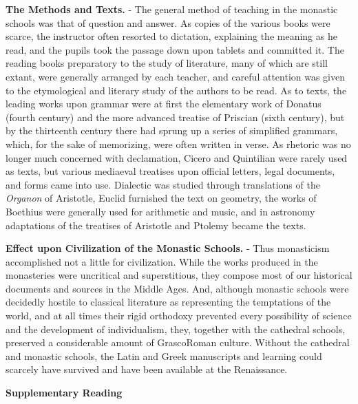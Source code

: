 \documentclass[
]{book}
\begin{document}
\textbf{The Methods and Texts.} - The general method of teaching in the monastic schools was that of question and answer. As copies of the various books were scarce, the instructor often resorted to dictation, explaining the meaning as he read, and the pupils took the passage down upon tablets and committed it. The reading books preparatory to the study of literature, many of which are still extant, were generally arranged by each teacher, and careful attention was given to the etymological and literary study of the authors to be read. As to texts, the leading works upon grammar were at first the elementary work of Donatus (fourth century) and the more advanced treatise of Priscian (sixth century), but by the thirteenth century there had sprung up a series of simplified grammars, which, for the sake of memorizing, were often written in verse. As rhetoric was no longer much concerned with declamation, Cicero and Quintilian were rarely used as texts, but various mediaeval treatises upon official letters, legal documents, and forms came into use. Dialectic was studied through translations of the \emph{Organon} of Aristotle, Euclid furnished the text on geometry, the works of Boethius were generally used for arithmetic and music, and in astronomy adaptations of the treatises of Aristotle and Ptolemy became the texts.

\textbf{Effect upon Civilization of the Monastic Schools.} - Thus monasticism accomplished not a little for civilization. While the works produced in the monasteries were uncritical and superstitious, they compose most of our historical documents and sources in the Middle Ages. And, although monastic schools were decidedly hostile to classical literature as representing the temptations of the world, and at all times their rigid orthodoxy prevented every possibility of science and the development of individualism, they, together with the cathedral schools, preserved a considerable amount of GrascoRoman culture. Without the cathedral and monastic schools, the Latin and Greek manuscripts and learning could scarcely have survived and have been available at the Renaissance.

\textbf{Supplementary Reading}
\end{document}
